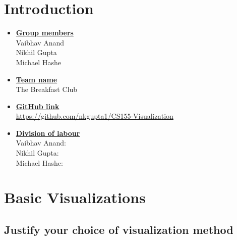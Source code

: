 \newif\ifshowsolutions
\showsolutionstrue

\newcommand{\boldline}[1]{\underline{\textbf{#1}}}


\usepackage{amsfonts} %
\usepackage{amsmath} %
\usepackage{longtable} %
\usepackage{enumitem}
\usepackage{graphicx} %
\graphicspath{{figures/}} %
\usepackage{makecell}
\usepackage[margin=2.25cm]{caption}


\pagestyle{fancy}

\section{Introduction}
\medskip
\begin{itemize}

    \item \boldline{Group members} \\
    Vaibhav Anand \\
    Nikhil Gupta \\
    Michael Hashe
    
    \item \boldline{Team name} \\
    The Breakfast Club

    \item \boldline{GitHub link} \\
    \href{https://github.com/nkgupta1/CS155-Visualization}{https://github.com/nkgupta1/CS155-Visualization}
    
    \item \boldline{Division of labour} \\
    Vaibhav Anand: \\
    Nikhil Gupta: \\
    Michael Hashe: 

\end{itemize}

\section{Basic Visualizations}
\medskip
\subsection{Justify your choice of visualization method}
